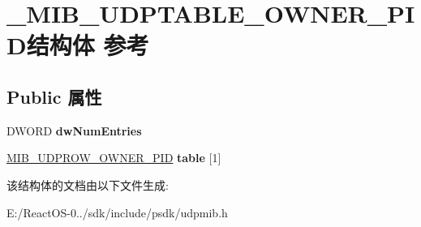 \hypertarget{struct___m_i_b___u_d_p_t_a_b_l_e___o_w_n_e_r___p_i_d}{}\section{\+\_\+\+M\+I\+B\+\_\+\+U\+D\+P\+T\+A\+B\+L\+E\+\_\+\+O\+W\+N\+E\+R\+\_\+\+P\+I\+D结构体 参考}
\label{struct___m_i_b___u_d_p_t_a_b_l_e___o_w_n_e_r___p_i_d}
\subsection*{Public 属性}
\begin{DoxyCompactItemize}
\item 
\mbox{\label{struct___m_i_b___u_d_p_t_a_b_l_e___o_w_n_e_r___p_i_d_a1d12012226b14db884d4d90a8d649d3c}} 
D\+W\+O\+RD {\bfseries dw\+Num\+Entries}
\item 
\mbox{\label{struct___m_i_b___u_d_p_t_a_b_l_e___o_w_n_e_r___p_i_d_a7c601bff2cfcfb6b2d207d9591122d6f}} 
\hyperlink{struct___m_i_b___u_d_p_r_o_w___o_w_n_e_r___p_i_d}{M\+I\+B\+\_\+\+U\+D\+P\+R\+O\+W\+\_\+\+O\+W\+N\+E\+R\+\_\+\+P\+ID} {\bfseries table} \mbox{[}1\mbox{]}
\end{DoxyCompactItemize}


该结构体的文档由以下文件生成\+:\begin{DoxyCompactItemize}
\item 
E\+:/\+React\+O\+S-\/0../sdk/include/psdk/udpmib.\+h\end{DoxyCompactItemize}
